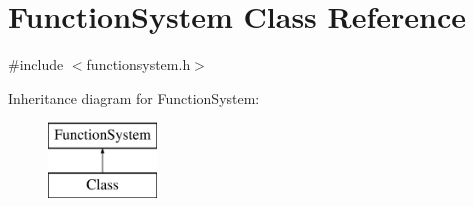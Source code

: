 \hypertarget{classFunctionSystem}{}\section{Function\+System Class Reference}
\label{classFunctionSystem}


{\ttfamily \#include $<$functionsystem.\+h$>$}

Inheritance diagram for Function\+System\+:\begin{figure}[H]
\begin{center}
\leavevmode
\includegraphics[height=2.000000cm]{classFunctionSystem}
\end{center}
\end{figure}
